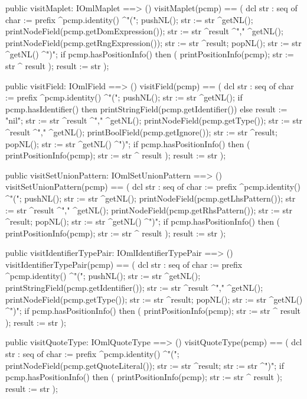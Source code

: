 \begin{vdm_al}
  public visitMaplet: IOmlMaplet ==> ()
  visitMaplet(pcmp) ==
    ( dcl str : seq of char := prefix ^pcmp.identity() ^"(";
      pushNL();
      str := str ^getNL();
      printNodeField(pcmp.getDomExpression());
      str := str ^result ^"," ^getNL();
      printNodeField(pcmp.getRngExpression());
      str := str ^result;
      popNL();
      str := str ^getNL() ^")";
      if pcmp.hasPositionInfo()
      then ( printPositionInfo(pcmp);
             str := str ^ result );
      result := str );

  public visitField: IOmlField ==> ()
  visitField(pcmp) ==
    ( dcl str : seq of char := prefix ^pcmp.identity() ^"(";
      pushNL();
      str := str ^getNL();
      if pcmp.hasIdentifier()
      then printStringField(pcmp.getIdentifier())
      else result := "nil";
      str := str ^result ^"," ^getNL();
      printNodeField(pcmp.getType());
      str := str ^result ^"," ^getNL();
      printBoolField(pcmp.getIgnore());
      str := str ^result;
      popNL();
      str := str ^getNL() ^")";
      if pcmp.hasPositionInfo()
      then ( printPositionInfo(pcmp);
             str := str ^ result );
      result := str );

  public visitSetUnionPattern: IOmlSetUnionPattern ==> ()
  visitSetUnionPattern(pcmp) ==
    ( dcl str : seq of char := prefix ^pcmp.identity() ^"(";
      pushNL();
      str := str ^getNL();
      printNodeField(pcmp.getLhsPattern());
      str := str ^result ^"," ^getNL();
      printNodeField(pcmp.getRhsPattern());
      str := str ^result;
      popNL();
      str := str ^getNL() ^")";
      if pcmp.hasPositionInfo()
      then ( printPositionInfo(pcmp);
             str := str ^ result );
      result := str );

  public visitIdentifierTypePair: IOmlIdentifierTypePair ==> ()
  visitIdentifierTypePair(pcmp) ==
    ( dcl str : seq of char := prefix ^pcmp.identity() ^"(";
      pushNL();
      str := str ^getNL();
      printStringField(pcmp.getIdentifier());
      str := str ^result ^"," ^getNL();
      printNodeField(pcmp.getType());
      str := str ^result;
      popNL();
      str := str ^getNL() ^")";
      if pcmp.hasPositionInfo()
      then ( printPositionInfo(pcmp);
             str := str ^ result );
      result := str );

  public visitQuoteType: IOmlQuoteType ==> ()
  visitQuoteType(pcmp) ==
    ( dcl str : seq of char := prefix ^pcmp.identity() ^"(";
      printNodeField(pcmp.getQuoteLiteral());
      str := str ^result;
      str := str ^")";
      if pcmp.hasPositionInfo()
      then ( printPositionInfo(pcmp);
             str := str ^ result );
      result := str );


\end{vdm_al}
